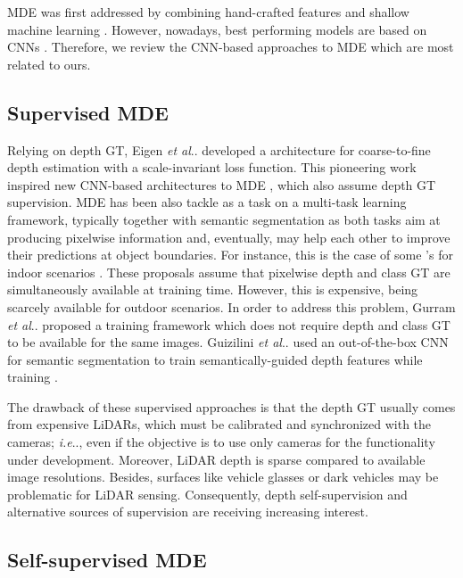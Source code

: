 \documentclass[journal]{IEEEtran}
\makeatletter
\DeclareRobustCommand\onedot{\futurelet\@let@token\@onedot}
\def\@onedot{\ifx\@let@token.\else.\null\fi\xspace}
\def\ie{\emph{i.e}\onedot} \def\Ie{\emph{I.e}\onedot}
\def\etal{\emph{et al}\onedot}
\makeatother
\begin{document}
MDE was first addressed by combining hand-crafted features and shallow machine learning \cite{Saxena:2007, Liu:2010, Ladicky:2014, Srikakulapu:2015}. However, nowadays, best performing models are based on CNNs \cite{De:2021}. Therefore, we review the CNN-based approaches to MDE which are most related to ours. 


\subsection{Supervised MDE}
\label{sec:rw:supervised}

Relying on depth GT, Eigen {\etal} \cite{Eigen:2014} developed a  architecture for coarse-to-fine depth estimation with a scale-invariant loss function. This pioneering work inspired new CNN-based architectures to MDE \cite{Liu:2016, Laina:2016, Roy:2016, Cao:2017, He:2018, Xu:2018, Fu:2018DORN}, which also assume depth GT supervision. MDE has been also tackle as a task on a multi-task learning framework, typically together with semantic segmentation as both tasks aim at producing pixelwise information and, eventually, may help each other to improve their predictions at object boundaries. For instance, this is the case 
of some {'s} for indoor scenarios \cite{Mousavian:2016, Jafari:2017, Jiao:2018}. These proposals assume that pixelwise depth and class GT are simultaneously available at training time. 
However, this is expensive, being scarcely available for outdoor scenarios. In order to address this problem, Gurram {\etal} \cite{Gurram:2018} proposed a training framework which does not require depth and class GT to be available for the same images. Guizilini {\etal} \cite{Guizilini:2020semantic} used an out-of-the-box CNN for semantic segmentation to train semantically-guided depth features while training . 

The drawback of these supervised approaches is that the depth GT usually comes from expensive LiDARs, which must be calibrated and synchronized with the cameras; {\ie}, even if the objective is to use only cameras for the functionality under development. Moreover, LiDAR depth is sparse compared to available image resolutions.
Besides, surfaces like vehicle glasses or dark vehicles may be problematic for LiDAR sensing. Consequently, depth self-supervision and alternative sources of supervision are receiving increasing interest. 

\subsection{Self-supervised MDE}
\label{sec:rw:self-supervised}
\end{document}
